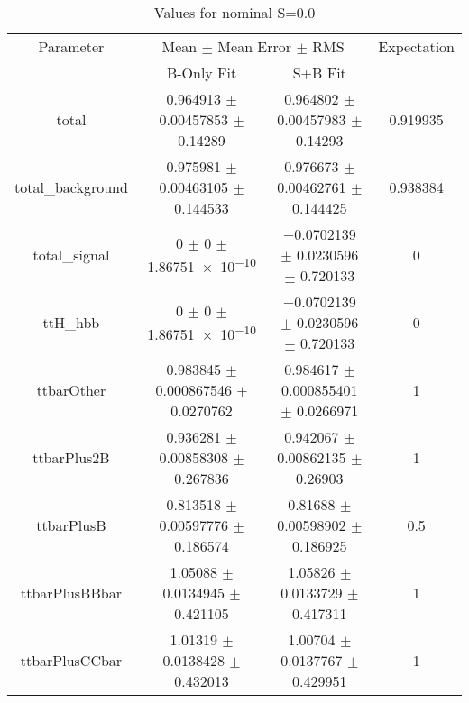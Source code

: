 \begin{table}
\centering
\caption{Values for nominal S=0.0}
\begin{tabular}{cccc}
\toprule
Parameter & \multicolumn{2}{c}{Mean $\pm$ Mean Error $\pm$ RMS} & Expectation\\
 & B-Only Fit & S+B Fit & \\
\midrule
total & \num{0.964913} $\pm$ \num{0.00457853} $\pm$ \num{0.14289} & \num{0.964802} $\pm$ \num{0.00457983} $\pm$ \num{0.14293} & \num{0.919935}\\
total\_background & \num{0.975981} $\pm$ \num{0.00463105} $\pm$ \num{0.144533} & \num{0.976673} $\pm$ \num{0.00462761} $\pm$ \num{0.144425} & \num{0.938384}\\
total\_signal & \num{0} $\pm$ \num{0} $\pm$ \num{1.86751e-10} & \num{-0.0702139} $\pm$ \num{0.0230596} $\pm$ \num{0.720133} & \num{0}\\
ttH\_hbb & \num{0} $\pm$ \num{0} $\pm$ \num{1.86751e-10} & \num{-0.0702139} $\pm$ \num{0.0230596} $\pm$ \num{0.720133} & \num{0}\\
ttbarOther & \num{0.983845} $\pm$ \num{0.000867546} $\pm$ \num{0.0270762} & \num{0.984617} $\pm$ \num{0.000855401} $\pm$ \num{0.0266971} & \num{1}\\
ttbarPlus2B & \num{0.936281} $\pm$ \num{0.00858308} $\pm$ \num{0.267836} & \num{0.942067} $\pm$ \num{0.00862135} $\pm$ \num{0.26903} & \num{1}\\
ttbarPlusB & \num{0.813518} $\pm$ \num{0.00597776} $\pm$ \num{0.186574} & \num{0.81688} $\pm$ \num{0.00598902} $\pm$ \num{0.186925} & \num{0.5}\\
ttbarPlusBBbar & \num{1.05088} $\pm$ \num{0.0134945} $\pm$ \num{0.421105} & \num{1.05826} $\pm$ \num{0.0133729} $\pm$ \num{0.417311} & \num{1}\\
ttbarPlusCCbar & \num{1.01319} $\pm$ \num{0.0138428} $\pm$ \num{0.432013} & \num{1.00704} $\pm$ \num{0.0137767} $\pm$ \num{0.429951} & \num{1}\\
\bottomrule
\end{tabular}
\end{table}